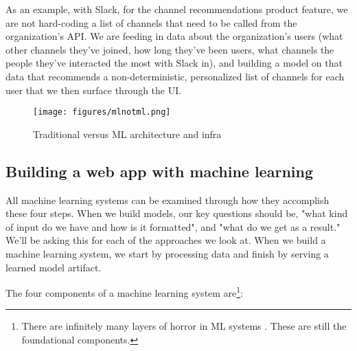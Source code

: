 \documentclass[11pt, table]{diazessay} %
\begin{document}
\begin{sloppypar}
As an example, with Slack, for the channel recommendations product feature, we are not hard-coding a list of channels that need to be called from the organization's API. We are feeding in data about the organization's users (what other channels they've joined, how long they've been users, what channels the people they've interacted the most with Slack in), and building a model on that data that recommends a non-deterministic, personalized list of channels for each user that we then surface through the UI.

\begin{figure}[H]
\centering
\texttt{[image: figures/mlnotml.png]}
\caption{Traditional versus ML architecture and infra}
\end{figure}

\subsection{Building a web app with machine learning}

All machine learning systems can be examined through how they accomplish these four steps. When we build models, our key questions should be, "what kind of input do we have and how is it formatted", and "what do we get as a result." We'll be asking this for each of the approaches we look at.  When we build a machine learning system, we start by processing data and finish by serving a learned model artifact.

The four components of a machine learning system are\footnote{There are infinitely many layers of horror in ML systems \citep{kreuzberger2022machine}. These are still the foundational components.}:


\end{sloppypar}
\end{document}

